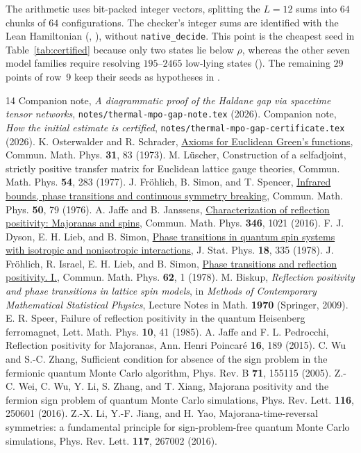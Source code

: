 \documentclass[aps,prl,reprint,amsmath,amssymb,nofootinbib,raggedbottom]{revtex4-2}
\begin{document}
The arithmetic uses bit-packed integer vectors, splitting the $L=12$ sums into
$64$ chunks of $64$ configurations. The checker's integer sums are identified
with the Lean Hamiltonian (,
), without \texttt{native\_decide}. This point is the cheapest seed in
Table~\ref{tab:certified} because only two states lie below $\rho$, whereas the
other seven model families require resolving $195\text{--}2465$ low-lying
states (). The remaining $29$ points of row~9 keep
their seeds as hypotheses in
.

\begin{thebibliography}{14}
Companion note, \emph{A diagrammatic proof of the Haldane gap via spacetime
tensor networks}, \texttt{notes/thermal-mpo-gap-note.tex} (2026).
Companion note, \emph{How the initial estimate is certified},
\texttt{notes/thermal-mpo-gap-certificate.tex} (2026).
K. Osterwalder and R. Schrader,
\href{https://doi.org/10.1007/BF01645738}{Axioms for Euclidean Green's
functions}, Commun. Math. Phys. \textbf{31}, 83 (1973).
M. L\"uscher, Construction of a selfadjoint, strictly positive transfer
matrix for Euclidean lattice gauge theories, Commun. Math. Phys.
\textbf{54}, 283 (1977).
J. Fr\"ohlich, B. Simon, and T. Spencer,
\href{https://doi.org/10.1007/BF01608557}{Infrared bounds, phase
transitions and continuous symmetry breaking}, Commun. Math. Phys.
\textbf{50}, 79 (1976).
A. Jaffe and B. Janssens,
\href{https://doi.org/10.1007/s00220-015-2545-z}{Characterization of
reflection positivity: Majoranas and spins}, Commun. Math. Phys.
\textbf{346}, 1021 (2016).
F. J. Dyson, E. H. Lieb, and B. Simon,
\href{https://doi.org/10.1007/BF01106729}{Phase transitions in quantum spin
systems with isotropic and nonisotropic interactions},
J. Stat. Phys. \textbf{18}, 335 (1978).
J. Fr\"ohlich, R. Israel, E. H. Lieb, and B. Simon,
\href{https://doi.org/10.1007/BF01940327}{Phase transitions and reflection
positivity. I.}, Commun. Math. Phys. \textbf{62}, 1 (1978).
M. Biskup, \emph{Reflection positivity and phase transitions in lattice spin
models}, in \emph{Methods of Contemporary Mathematical Statistical
Physics}, Lecture Notes in Math. \textbf{1970} (Springer, 2009).
E. R. Speer, Failure of reflection positivity in the quantum Heisenberg
ferromagnet, Lett. Math. Phys. \textbf{10}, 41 (1985).
A. Jaffe and F. L. Pedrocchi, Reflection positivity for Majoranas,
Ann. Henri Poincar\'e \textbf{16}, 189 (2015).
C. Wu and S.-C. Zhang, Sufficient condition for absence of the sign problem
in the fermionic quantum Monte Carlo algorithm, Phys. Rev. B \textbf{71},
155115 (2005).
Z.-C. Wei, C. Wu, Y. Li, S. Zhang, and T. Xiang, Majorana positivity and the
fermion sign problem of quantum Monte Carlo simulations,
Phys. Rev. Lett. \textbf{116}, 250601 (2016).
Z.-X. Li, Y.-F. Jiang, and H. Yao, Majorana-time-reversal symmetries: a
fundamental principle for sign-problem-free quantum Monte Carlo
simulations, Phys. Rev. Lett. \textbf{117}, 267002 (2016).
\end{thebibliography}
\end{document}
